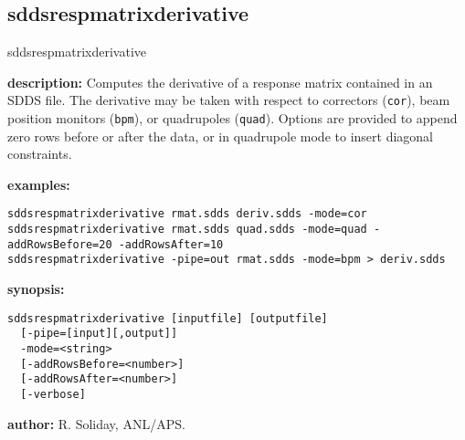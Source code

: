 %
\newpage
\subsection{sddsrespmatrixderivative}
\label{sddsrespmatrixderivative}

\begin{sddsprog}{sddsrespmatrixderivative}
  \item \textbf{description:} Computes the derivative of a response matrix contained in an SDDS file. The derivative may be taken with respect to correctors (\verb|cor|), beam position monitors (\verb|bpm|), or quadrupoles (\verb|quad|). Options are provided to append zero rows before or after the data, or in quadrupole mode to insert diagonal constraints.
  \item \textbf{examples:}
    \begin{verbatim}
sddsrespmatrixderivative rmat.sdds deriv.sdds -mode=cor
sddsrespmatrixderivative rmat.sdds quad.sdds -mode=quad -addRowsBefore=20 -addRowsAfter=10
sddsrespmatrixderivative -pipe=out rmat.sdds -mode=bpm > deriv.sdds
    \end{verbatim}
  \item \textbf{synopsis:}
    \begin{verbatim}
sddsrespmatrixderivative [inputfile] [outputfile]
  [-pipe=[input][,output]]
  -mode=<string>
  [-addRowsBefore=<number>]
  [-addRowsAfter=<number>]
  [-verbose]
    \end{verbatim}
  \item \textbf{author:} R. Soliday, ANL/APS.
\end{sddsprog}

